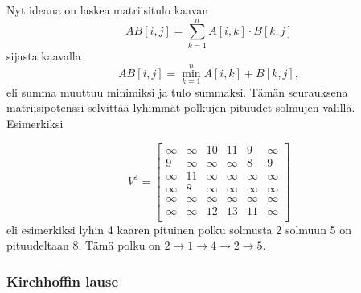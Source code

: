 Nyt ideana on laskea matriisitulo kaavan
\[
AB[i,j] = \sum_{k=1}^n A[i,k] \cdot B[k,j]
\]
sijasta kaavalla
\[
AB[i,j] = \min_{k=1}^n A[i,k] + B[k,j],
\]
eli summa muuttuu minimiksi ja tulo summaksi.
Tämän seurauksena matriisipotenssi
selvittää lyhimmät polkujen pituudet solmujen
välillä. Esimerkiksi

\[
V^4= \begin{bmatrix}
  \infty & \infty & 10 & 11 & 9 & \infty \\
  9 & \infty & \infty & \infty & 8 & 9 \\
  \infty & 11 & \infty & \infty & \infty & \infty \\
  \infty & 8 & \infty & \infty & \infty & \infty \\
  \infty & \infty & \infty & \infty & \infty & \infty \\
  \infty & \infty & 12 & 13 & 11 & \infty \\
 \end{bmatrix}
\]
eli esimerkiksi lyhin 4 kaaren pituinen polku
solmusta 2 solmuun 5 on pituudeltaan 8.
Tämä polku on $2 \rightarrow 1 \rightarrow 4 \rightarrow 2 \rightarrow 5$.

\subsubsection{Kirchhoffin lause}


